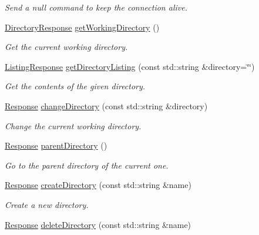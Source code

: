 \begin{DoxyCompactItemize}
\begin{DoxyCompactList}\small\item\em Send a null command to keep the connection alive. \end{DoxyCompactList}\item 
\mbox{\hyperlink{classsf_1_1_ftp_1_1_directory_response}{Directory\+Response}} \mbox{\hyperlink{classsf_1_1_ftp_a79c654fcdd0c81e68c4fa29af3b45e0c}{get\+Working\+Directory}} ()
\begin{DoxyCompactList}\small\item\em Get the current working directory. \end{DoxyCompactList}\item 
\mbox{\hyperlink{classsf_1_1_ftp_1_1_listing_response}{Listing\+Response}} \mbox{\hyperlink{classsf_1_1_ftp_a8f37258e461fcb9e2a0655e9df0be4a0}{get\+Directory\+Listing}} (const std\+::string \&directory=\char`\"{}\char`\"{})
\begin{DoxyCompactList}\small\item\em Get the contents of the given directory. \end{DoxyCompactList}\item 
\mbox{\hyperlink{classsf_1_1_ftp_1_1_response}{Response}} \mbox{\hyperlink{classsf_1_1_ftp_a7e93488ea6330dd4dd76e428da9bb6d3}{change\+Directory}} (const std\+::string \&directory)
\begin{DoxyCompactList}\small\item\em Change the current working directory. \end{DoxyCompactList}\item 
\mbox{\hyperlink{classsf_1_1_ftp_1_1_response}{Response}} \mbox{\hyperlink{classsf_1_1_ftp_ad295cf77f30f9ad07b5c401fd9849189}{parent\+Directory}} ()
\begin{DoxyCompactList}\small\item\em Go to the parent directory of the current one. \end{DoxyCompactList}\item 
\mbox{\hyperlink{classsf_1_1_ftp_1_1_response}{Response}} \mbox{\hyperlink{classsf_1_1_ftp_a247b84c4b25da37804218c2b748c4787}{create\+Directory}} (const std\+::string \&name)
\begin{DoxyCompactList}\small\item\em Create a new directory. \end{DoxyCompactList}\item 
\mbox{\hyperlink{classsf_1_1_ftp_1_1_response}{Response}} \mbox{\hyperlink{classsf_1_1_ftp_a2a8a7ef9144204b5b319c9a4be8806c2}{delete\+Directory}} (const std\+::string \&name)

\end{DoxyCompactItemize}
